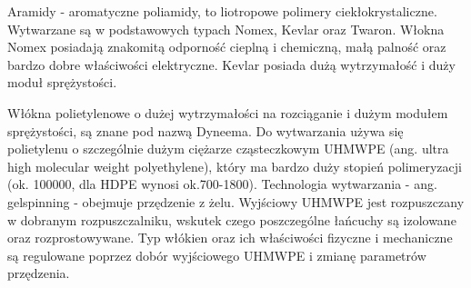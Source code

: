 \documentclass[magister,druk]{dyplom}
\begin{document}
Aramidy - aromatyczne poliamidy, to liotropowe polimery ciekłokrystaliczne. Wytwarzane są w podstawowych typach Nomex, Kevlar oraz Twaron. Włokna Nomex posiadają znakomitą odporność cieplną i chemiczną, małą palność oraz bardzo dobre właściwości elektryczne. Kevlar posiada dużą wytrzymałość i duży moduł sprężystości. 

Włókna polietylenowe o dużej wytrzymałości na rozciąganie i dużym modułem sprężystości, są znane pod nazwą Dyneema. Do wytwarzania używa się polietylenu o szczególnie dużym ciężarze cząsteczkowym UHMWPE (ang. ultra high molecular weight polyethylene), który ma bardzo duży stopień polimeryzacji (ok. 100000, dla HDPE wynosi ok.700-1800). Technologia wytwarzania - ang. gelspinning - obejmuje przędzenie z żelu. Wyjściowy UHMWPE jest rozpuszczany w dobranym rozpuszczalniku, wskutek czego poszczególne łańcuchy są izolowane oraz rozprostowywane. Typ włókien oraz ich właściwości fizyczne i mechaniczne są regulowane poprzez dobór wyjściowego UHMWPE i zmianę parametrów przędzenia. 

\begin{table}[]
	\centering
	\caption{Porównanie właściwości włókien \cite{Krolikowski2012}}
	\label{my-label}
\end{table}
\end{document}
